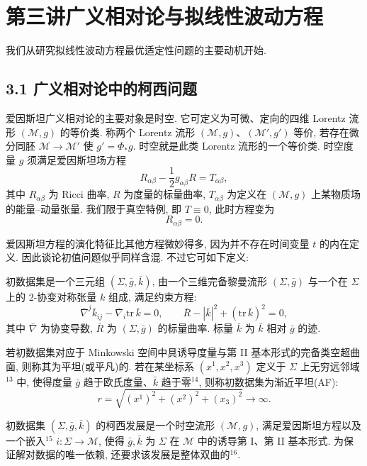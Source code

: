 \chapter{第三讲\quad 广义相对论与拟线性波动方程}

我们从研究拟线性波动方程最优适定性问题的主要动机开始.
\section*{3.1 广义相对论中的柯西问题}

爱因斯坦广义相对论的主要对象是时空. 它可定义为可微、定向的四维 Lorentz 流形 $(\mathcal{M}, g)$ 的等价类. 称两个 Lorentz 流形 $(\mathcal{M}, g)$、$(\mathcal{M}', g')$ 等价, 若存在微分同胚 $\mathcal{M} \longrightarrow \mathcal{M}'$ 使 $g' = \Phi_* g$. 时空就是此类 Lorentz 流形的一个等价类. 时空度量 $g$ 须满足爱因斯坦场方程
\[
R_{\alpha\beta}-\frac{1}{2}g_{\alpha\beta}R=T_{\alpha\beta},
\]
其中 $R_{\alpha\beta}$ 为 Ricci 曲率, $R$ 为度量的标量曲率, $T_{\alpha\beta}$ 为定义在 $(\mathcal{M}, g)$ 上某物质场的能量--动量张量. 我们限于真空特例, 即 $T\equiv0$, 此时方程变为
\[
R_{\alpha\beta}=0.
\]

爱因斯坦方程的演化特征比其他方程微妙得多, 因为并不存在时间变量 $t$ 的内在定义. 因此谈论初值问题似乎同样含混. 不过它可如下定义:
\setcounter{mtthm}{1}
\begin{definition}\label{def:3.2}
初数据集是一个三元组 $(\Sigma, \bar{g}, \bar{k})$, 由一个三维完备黎曼流形 $(\Sigma, \bar{g})$ 与一个在 $\Sigma$ 上的 2-协变对称张量 $k$ 组成, 满足约束方程:
\[
\bar{\nabla}^{j}\bar{k}_{i j}-\bar{\nabla}_{i}\mathrm{tr}\,\bar{k}=0,\qquad
\bar{R}-|\bar{k}|^{2}+(\mathrm{tr}\,\bar{k})^{2}=0,
\]
其中 $\bar{\nabla}$ 为协变导数, $\bar{R}$ 为 $(\Sigma, \bar{g})$ 的标量曲率. 标量 $\bar{k}$ 为 $\bar{k}$ 相对 $\bar{g}$ 的迹.\end{definition}

\setcounter{mtthm}{2}
\begin{definition}\label{def:3.3}
若初数据集对应于 Minkowski 空间中具诱导度量与第 II 基本形式的完备类空超曲面, 则称其为平坦(或平凡)的. 若在某坐标系 $(x^1, x^2, x^3)$ 定义于 $\Sigma$ 上无穷远邻域$^{13}$ 中, 使得度量 $\bar{g}$ 趋于欧氏度量、$\bar{k}$ 趋于零$^{14}$, 则称初数据集为渐近平坦(AF):
\[
r=\sqrt{(x^{1})^{2}+(x^{2})^{2}+(x_{3})^{2}}\to\infty.
\]
\end{definition}

\setcounter{mtthm}{3}
\begin{definition}\label{def:3.4}
初数据集 $(\Sigma, \bar{g}, \bar{k})$ 的柯西发展是一个时空流形 $(\mathcal{M}, g)$, 满足爱因斯坦方程以及一个嵌入$^{15}$ $i: \Sigma \longrightarrow \mathcal{M}$, 使得 $\bar{g}, \bar{k}$ 为 $\Sigma$ 在 $\mathcal{M}$ 中的诱导第 I、第 II 基本形式. 为保证解对数据的唯一依赖, 还要求该发展是整体双曲的$^{16}$.\end{definition}

